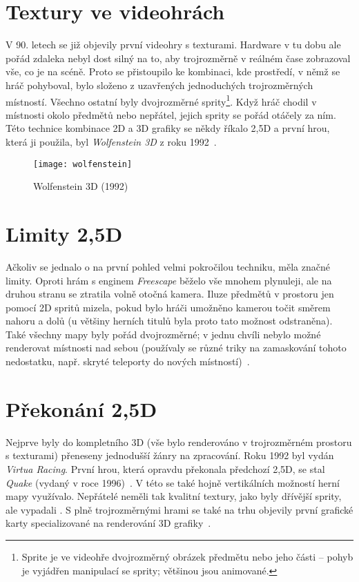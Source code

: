 \documentclass[a4paper, 11pt]{report}
\begin{document}
\begin{chapterwithoutpagebreak}
\section{Textury ve videohrách}
V 90. letech se již objevily první videohry s texturami. Hardware v tu dobu ale pořád zdaleka nebyl dost silný na to, aby trojrozměrně v reálném čase zobrazoval vše, co je na scéně. Proto se přistoupilo ke kombinaci, kde prostředí, v němž se hráč pohyboval, bylo složeno z uzavřených jednoduchých trojrozměrných místností. Všechno ostatní byly dvojrozměrné sprity\footnote{Sprite je ve videohře dvojrozměrný obrázek předmětu nebo jeho části -- pohyb je vyjádřen manipulací se sprity; většinou jsou animované.}. Když hráč chodil v místnosti okolo předmětů nebo nepřátel, jejich sprity se pořád otáčely za ním. Této technice kombinace 2D a 3D grafiky se někdy říkalo 2,5D a první hrou, která ji použila, byl \emph{Wolfenstein 3D} z roku 1992~\cite{techradar:evolution}.

\begin{figure}[h]
    \centering
    \texttt{[image: wolfenstein]}
    \caption[Wolfenstein 3D (1992)]{Wolfenstein 3D (1992)~\cite{pic:wolfenstein}}
\end{figure}

\section{Limity 2,5D}
Ačkoliv se jednalo o na první pohled velmi pokročilou techniku, měla značné limity. Oproti hrám s enginem \emph{Freescape} běželo vše mnohem plynuleji, ale na druhou stranu se ztratila volně otočná kamera. Iluze předmětů v prostoru jen pomocí 2D spritů mizela, pokud bylo hráči umožněno kamerou točit směrem nahoru a dolů (u většiny herních titulů byla proto tato možnost odstraněna). Také všechny mapy byly pořád dvojrozměrné; v jednu chvíli nebylo možné renderovat místnosti nad sebou (používaly se různé triky na zamaskování tohoto nedostatku, např. skryté teleporty do nových místností)~\cite{techradar:evolution}.

\section{Překonání 2,5D}
Nejprve byly do kompletního 3D (vše bylo renderováno v trojrozměrném prostoru s texturami) přeneseny jednodušší žánry na zpracování. Roku 1992 byl vydán \emph{Virtua Racing}. První hrou, která opravdu překonala předchozí 2,5D, se stal \emph{Quake} (vydaný v roce 1996)~\cite{pcmag:history}. V této  se také hojně vertikálních možností herní mapy využívalo. Nepřátelé neměli tak kvalitní textury, jako byly dřívější sprity, ale vypadali . S plně trojrozměrnými hrami se také na trhu objevily první grafické karty specializované na renderování 3D grafiky~\cite{newegg:gpu}.


\end{chapterwithoutpagebreak}
\end{document}
